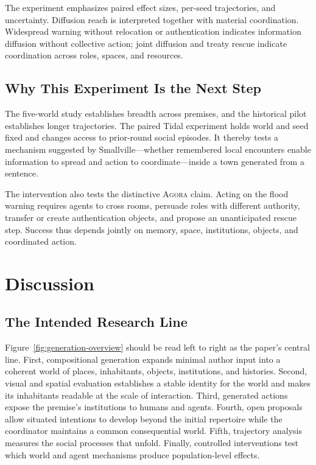 \documentclass[10pt,twocolumn]{article}
\newcommand{\agora}{\textsc{Agora}\xspace}
\begin{document}
The experiment emphasizes paired effect sizes, per-seed trajectories, and
uncertainty. Diffusion reach is interpreted together with material coordination.
Widespread warning without relocation or authentication indicates information
diffusion without collective action; joint diffusion and treaty rescue indicate
coordination across roles, spaces, and resources.

\subsection{Why This Experiment Is the Next Step}

The five-world study establishes breadth across premises, and the historical
pilot establishes longer trajectories. The paired Tidal experiment holds world
and seed fixed and changes access to prior-round social episodes. It thereby
tests a mechanism suggested by
Smallville---whether remembered local encounters enable information to spread
and action to coordinate---inside a town generated from a sentence.

The intervention also tests the distinctive \agora claim. Acting on the flood
warning requires agents to cross rooms, persuade
roles with different authority, transfer or create authentication objects, and
propose an unanticipated rescue step. Success thus depends jointly on memory,
space, institutions, objects, and coordinated action.

\section{Discussion}

\subsection{The Intended Research Line}

Figure~\ref{fig:generation-overview} should be read left to right as the paper's central
line. First, compositional generation expands minimal author input into a
coherent world of places, inhabitants, objects, institutions, and histories.
Second, visual and spatial evaluation establishes a stable identity for the
world and makes its inhabitants readable at the scale of interaction. Third,
generated actions expose the premise's institutions to humans and agents.
Fourth, open proposals allow situated intentions to develop beyond the initial
repertoire while the coordinator maintains a common consequential world. Fifth,
trajectory analysis measures the social processes that unfold. Finally,
controlled interventions test which world and agent mechanisms produce
population-level effects.
\end{document}
